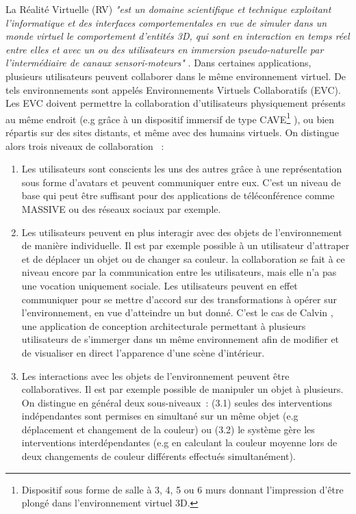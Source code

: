 \documentclass[11pt]{article}
\begin{document}
La Réalité Virtuelle (RV) \textit{"est un domaine scientifique et technique exploitant l’informatique et des interfaces comportementales en vue de simuler dans un monde virtuel le comportement d’entités 3D, qui sont en interaction en temps réel entre elles et avec un ou des utilisateurs en immersion pseudo-naturelle par l’intermédiaire de canaux sensori-moteurs"} \cite{trv1-chap1}. Dans certaines applications, plusieurs utilisateurs peuvent collaborer dans le même environnement virtuel. De tels environnements sont appelés Environnements Virtuels Collaboratifs (EVC). Les EVC doivent permettre la collaboration d'utilisateurs physiquement présents au même endroit (e.g grâce à un dispositif immersif de type CAVE\footnote{Dispositif sous forme de salle à 3, 4, 5 ou 6 murs donnant l'impression d'être plongé dans l'environnement virtuel 3D.} \cite{cave}), ou bien répartis sur des sites distants, et même avec des humains virtuels. On distingue alors trois niveaux de collaboration \cite{margery}~:
\begin{enumerate}
	\item Les utilisateurs sont conscients les uns des autres grâce à une représentation sous forme d'avatars et peuvent communiquer entre eux. C'est un niveau de base qui peut être suffisant pour des applications de téléconférence comme MASSIVE \cite{massive} ou des réseaux sociaux par exemple.
	\item Les utilisateurs peuvent en plus interagir avec des objets de l'environnement de manière individuelle. Il est par exemple possible à un utilisateur d'attraper et de déplacer un objet ou de changer sa couleur. la collaboration se fait à ce niveau encore par la communication entre les utilisateurs, mais elle n'a pas une vocation uniquement sociale. Les utilisateurs peuvent en effet communiquer pour se mettre d'accord sur des transformations à opérer sur l'environnement, en vue d'atteindre un but donné. C'est le cas de Calvin \cite{calvin}, une application de conception architecturale permettant à plusieurs utilisateurs de s'immerger dans un même environnement afin de modifier et de visualiser en direct l'apparence d'une scène d'intérieur.
	\item Les interactions avec les objets de l'environnement peuvent être collaboratives. Il est par exemple possible de manipuler un objet à plusieurs. On distingue en général deux sous-niveaux~: (3.1) seules des interventions indépendantes sont permises en simultané sur un même objet (e.g déplacement et changement de la couleur) ou (3.2) le système gère les interventions interdépendantes (e.g en calculant la couleur moyenne lors de deux changements de couleur différents effectués simultanément).
\end{enumerate}
\end{document}
